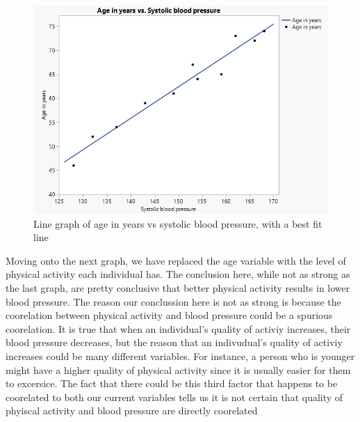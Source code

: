 \documentclass[14pt]{article}
\begin{document}
\begin{enumerate}
\begin{enumerate}[(a)]
\begin{figure}[h]
\includegraphics[scale=0.75]{hw1Pics/agevsbplinegraph.PNG}
\centering
\caption{Line graph of age in years vs systolic blood pressure, with a best fit line}
\end{figure}

\pagebreak

Moving onto the next graph, we have replaced the age variable with the level of physical activity each individual has. The conclusion here, while not as strong as the last graph, are pretty conclusive that better physical activity results in lower blood pressure. The reason our conclussion here is not as strong is because the coorelation between physical activity and blood pressure could be a spurious coorelation. It is true that when an individual's quality of activiy increases, their blood pressure decreases, but the reason that an indivudual's quality of activiy increases could be many different variables. For instance, a person who is younger might have a higher quality of physical activity since it is usually easier for them to excersice. The fact that there could be this third factor that happens to be coorelated to both our current variables tells us it is not certain that quality of phyiscal activity and blood pressure are directly coorelated \\



\end{enumerate}
\end{enumerate}
\end{document}

